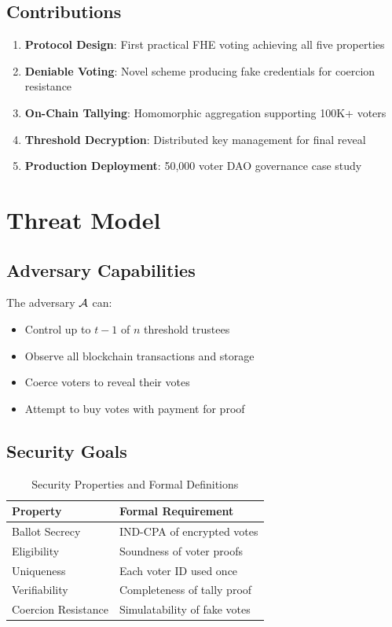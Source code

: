 \documentclass{../shared/luxfhe}
\begin{document}
\subsection{Contributions}

\begin{enumerate}
    \item \textbf{Protocol Design}: First practical FHE voting achieving all five properties
    \item \textbf{Deniable Voting}: Novel scheme producing fake credentials for coercion resistance
    \item \textbf{On-Chain Tallying}: Homomorphic aggregation supporting 100K+ voters
    \item \textbf{Threshold Decryption}: Distributed key management for final reveal
    \item \textbf{Production Deployment}: 50,000 voter DAO governance case study
\end{enumerate}

\section{Threat Model}

\subsection{Adversary Capabilities}

The adversary $\mathcal{A}$ can:
\begin{itemize}[noitemsep]
    \item Control up to $t-1$ of $n$ threshold trustees
    \item Observe all blockchain transactions and storage
    \item Coerce voters to reveal their votes
    \item Attempt to buy votes with payment for proof
\end{itemize}

\subsection{Security Goals}

\begin{table}[h]
\centering
\caption{Security Properties and Formal Definitions}
\begin{tabular}{ll}
\toprule
Property & Formal Requirement \\
\midrule
Ballot Secrecy & IND-CPA of encrypted votes \\
Eligibility & Soundness of voter proofs \\
Uniqueness & Each voter ID used once \\
Verifiability & Completeness of tally proof \\
Coercion Resistance & Simulatability of fake votes \\
\bottomrule
\end{tabular}
\end{table}
\end{document}
